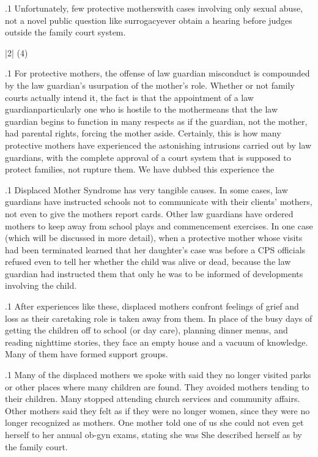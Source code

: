 \documentclass[11pt, twoside]{article}
\begin{document}
{\p.1{%
Unfortunately, few protective mothers\mdash{}with cases involving only
sexual abuse, not a novel public question like surrogacy\mdash{}ever obtain
a hearing before judges outside the family court system.
}%


\s|2|{ (4)}

\p.1{%
\noindent{}For protective mothers, the offense of law guardian misconduct is compounded by the law guardian’s usurpation of the mother’s role. Whether
or not family courts actually intend it, the fact is that the appointment
of a law guardian\mdash{}particularly one who is hostile to the
mother\mdash{}means that the law guardian begins to function in many respects as if
the guardian, not the mother, had parental rights, forcing the mother
aside. Certainly, this is how many protective mothers have experienced
the astonishing intrusions carried out by law guardians, with the complete approval of a court system that is supposed to protect families, not
rupture them. We have dubbed this experience the 
}%

\p.1{%
Displaced Mother Syndrome has very tangible causes. In some cases,
law guardians have instructed schools not to communicate with their
clients’ mothers, not even to give the mothers report cards. Other law
guardians have ordered mothers to keep away from school plays and
commencement exercises. In one case (which will be discussed in more
detail), when a protective mother whose visits had been terminated
learned that her daughter’s case was before a 
CPS officials refused even to tell her whether the child was alive or dead,
because the law guardian had instructed them that only he was to be
informed of developments involving the child.
}%

\p.1{%
After experiences like these, displaced mothers confront feelings of
grief and loss as their caretaking role is taken away from them. In place
of the busy days of getting the children off to school (or day care), planning dinner menus, and reading nighttime stories, they face an empty
house and a vacuum of knowledge. Many of them have formed support
groups.
}%

\p.1{%
Many of the displaced mothers we spoke with said they no longer visited parks or other places where many children are found. They avoided
 mothers tending to their children. Many stopped attending
church services and community affairs. Other mothers said they felt
\mdash{}as if they were no longer women, since they were no longer
recognized as mothers. One mother told one of us she could not even
get herself to her annual ob-gyn exams, stating she was  She described herself as 
by the family court.
}%

}
\end{document}
